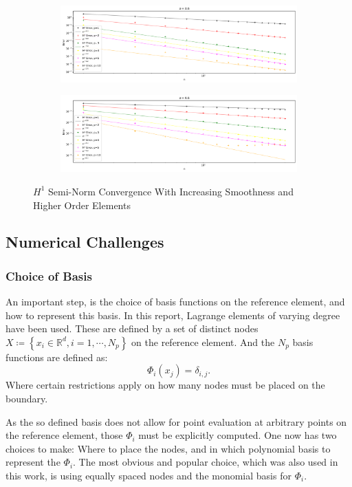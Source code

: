 \documentclass[11pt,a4paper]{article}
\begin{document}
\begin{multicols}{2}
\begin{figure}[H]
  \begin{subfigure}{1\linewidth}
    \centering
    \includegraphics[width=.8\linewidth]{errors_ridge_36_h1}
  \end{subfigure}

  \begin{subfigure}{1\linewidth}
    \centering
    \includegraphics[width=.8\linewidth]{errors_ridge_46_h1}
  \end{subfigure}

  \caption{$H^1$ Semi-Norm Convergence With Increasing Smoothness and Higher Order Elements}
  \label{fig:err_ridge_h1}
\end{figure}


\subsection*{Numerical Challenges}
\subsubsection*{Choice of Basis}
An important step, is the choice of basis functions on the reference element, and how to represent this basis.
In this report, Lagrange elements of varying degree have been used.
These are defined by a set of distinct nodes $X \coloneqq \left\{x_i \in \mathbb{R}^d, i = 1,\cdots, N_p\right\}$ on the reference element.
And the $N_p$ basis functions are defined as:
$$\Phi_i(x_j) = \delta_{i,j}.$$
Where certain restrictions apply on how many nodes must be placed on the boundary.

As the so defined basis does not allow for point evaluation at arbitrary points on the reference element,
those $\Phi_i$ must be explicitly computed.
One now has two choices to make: Where to place the nodes, and in which polynomial basis to represent the $\Phi_i$.
The most obvious and popular choice, which was also used in this work, is using equally spaced nodes and the monomial
basis for $\Phi_i$.


\end{multicols}
\end{document}
